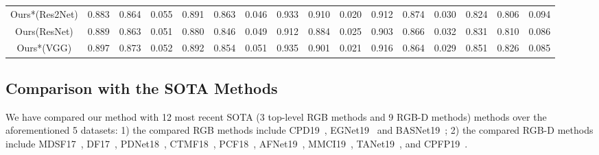 \documentclass[journal]{IEEEtran}
\begin{document}
\begin{table*}[htbp]
{\begin{tabular}{c|ccc|ccc|ccc|ccc|ccc}
    Ours*(Res2Net) & \multicolumn{1}{c}{0.883} & \multicolumn{1}{c}{\textcolor[rgb]{0.000, 1.000, 0.000}{0.864}} & 0.055 & \multicolumn{1}{c}{\textcolor[rgb]{0.000, 0.000, 1.000}{0.891}} & \multicolumn{1}{c}{\textcolor[rgb]{1.000, 0.000, 0.000}{0.863}} & \textcolor[rgb]{1.000, 0.000, 0.000}{0.046} & \multicolumn{1}{c}{\textcolor[rgb]{0.000, 0.000, 1.000}{0.933}} & \multicolumn{1}{c}{\textcolor[rgb]{1.000, 0.000, 0.000}{0.910}} & \textcolor[rgb]{1.000, 0.000, 0.000}{0.020} & \multicolumn{1}{c}{\textcolor[rgb]{0.000, 0.000, 1.000}{0.912}} & \multicolumn{1}{c}{\textcolor[rgb]{1.000, 0.000, 0.000}{0.874}} & \textcolor[rgb]{0.000, 0.000, 1.000}{0.030} & 0.824 & 0.806 & 0.094 \\
    \rowcolor{mygray}
    Ours(ResNet) & \textcolor[rgb]{0.000, 0.000, 1.000}{0.889} & 0.863 & \textcolor[rgb]{1.000, 0.000, 0.000}{0.051} & 0.880 & 0.846 & \textcolor[rgb]{0.000, 1.000, 0.000}{0.049} & 0.912 & 0.884 & 0.025 & 0.903 & \textcolor[rgb]{0.000, 1.000, 0.000}{0.866} & 0.032 & \textcolor[rgb]{0.000, 0.000, 1.000}{0.831} & \textcolor[rgb]{0.000, 1.000, 0.000}{0.810} & \textcolor[rgb]{0.000, 0.000, 1.000}{0.086} \\
    Ours*(VGG) & \multicolumn{1}{c}{\textcolor[rgb]{1.000, 0.000, 0.000}{0.897}} & \multicolumn{1}{c}{\textcolor[rgb]{1.000, 0.000, 0.000}{0.873}} & \textcolor[rgb]{0.000, 0.000, 1.000}{0.052} & \multicolumn{1}{c}{\textcolor[rgb]{1.000, 0.000, 0.000}{0.892}} & \multicolumn{1}{c}{\textcolor[rgb]{0.000, 1.000, 0.000}{0.854}} & 0.051 & \multicolumn{1}{c}{\textcolor[rgb]{1.000, 0.000, 0.000}{0.935}} & \multicolumn{1}{c}{\textcolor[rgb]{0.000, 0.000, 1.000}{0.901}} & \textcolor[rgb]{0.000, 0.000, 1.000}{0.021} & \multicolumn{1}{c}{\textcolor[rgb]{1.000, 0.000, 0.000}{0.916}} & \multicolumn{1}{c}{0.864} & \textcolor[rgb]{1.000, 0.000, 0.000}{0.029} & \textcolor[rgb]{1.000, 0.000, 0.000}{0.851} & \textcolor[rgb]{1.000, 0.000, 0.000}{0.826} & \textcolor[rgb]{1.000, 0.000, 0.000}{0.085} \\
\toprule[1pt]
    \end{tabular}}
  \label{tab:addlabel}\end{table*}

\subsection{Comparison with the SOTA Methods}
We have compared our method with 12 most recent SOTA (3 top-level RGB methods and 9 RGB-D methods) methods over the aforementioned 5 datasets: 1) the compared RGB methods include CPD19~\cite{CPD}, EGNet19~\cite{EGNet} and BASNet19~\cite{BASNet}; 2) the compared RGB-D methods include MDSF17~\cite{song2017depth}, DF17~\cite{TIP_Q2017}, PDNet18~\cite{Zhu2018PDNet}, CTMF18~\cite{han2017cnns}, PCF18~\cite{chen2018progressively}, AFNet19~\cite{wang2019adaptive}, MMCI19~\cite{chen2019multi}, TANet19~\cite{chen2019three}, and CPFP19~\cite{zhao2019contrast}.
\end{document}

